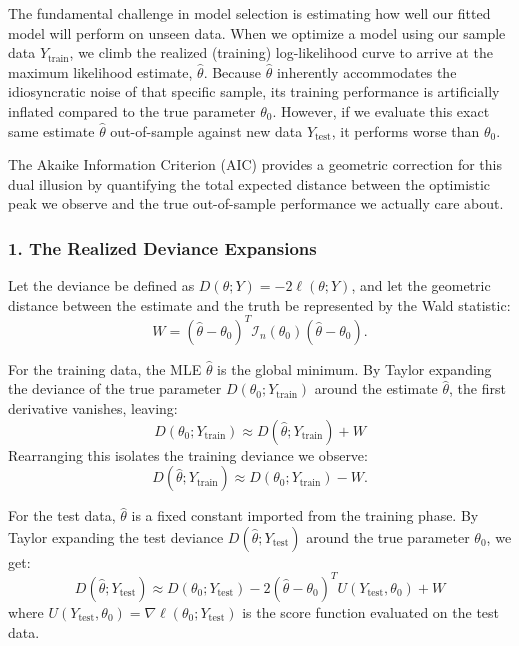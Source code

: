 \documentclass[
  letterpaper,
  DIV=11,
  numbers=noendperiod]{scrreprt}
\renewcommand{\[}{\begin{equation}}
\renewcommand{\]}{\end{equation}}
\theoremstyle{definition}
\theoremstyle{plain}
\theoremstyle{plain}
\theoremstyle{plain}
\theoremstyle{definition}
\theoremstyle{plain}
\theoremstyle{remark}
\begin{document}
The fundamental challenge in model selection is estimating how well our
fitted model will perform on unseen data. When we optimize a model using
our sample data \(Y_{\mathrm{train}}\), we climb the realized (training)
log-likelihood curve to arrive at the maximum likelihood estimate,
\(\hat{\theta}\). Because \(\hat{\theta}\) inherently accommodates the
idiosyncratic noise of that specific sample, its training performance is
artificially inflated compared to the true parameter \(\theta_0\).
However, if we evaluate this exact same estimate \(\hat{\theta}\)
out-of-sample against new data \(Y_{\mathrm{test}}\), it performs worse
than \(\theta_0\).

The Akaike Information Criterion (AIC) provides a geometric correction
for this dual illusion by quantifying the total expected distance
between the optimistic peak we observe and the true out-of-sample
performance we actually care about.

\subsubsection*{1. The Realized Deviance
Expansions}\label{the-realized-deviance-expansions}

Let the deviance be defined as \(D(\theta; Y) = -2\ell(\theta; Y)\), and
let the geometric distance between the estimate and the truth be
represented by the Wald statistic: \[
W = (\hat{\theta} - \theta_0)^T \mathcal{I}_n(\theta_0) (\hat{\theta} - \theta_0).
\]

For the training data, the MLE \(\hat{\theta}\) is the global minimum.
By Taylor expanding the deviance of the true parameter
\(D(\theta_0; Y_{\mathrm{train}})\) around the estimate
\(\hat{\theta}\), the first derivative vanishes, leaving: \[
D(\theta_0; Y_{\mathrm{train}}) \approx D(\hat{\theta}; Y_{\mathrm{train}}) + W
\] Rearranging this isolates the training deviance we observe: \[
\boxed{D(\hat{\theta}; Y_{\mathrm{train}}) \approx D(\theta_0; Y_{\mathrm{train}}) - W}.
\]

For the test data, \(\hat{\theta}\) is a fixed constant imported from
the training phase. By Taylor expanding the test deviance
\(D(\hat{\theta}; Y_{\mathrm{test}})\) around the true parameter
\(\theta_0\), we get: \[
D(\hat{\theta}; Y_{\mathrm{test}}) \approx D(\theta_0; Y_{\mathrm{test}}) - 2(\hat{\theta} - \theta_0)^T U(Y_{\mathrm{test}}, \theta_0) + W
\] where
\(U(Y_{\mathrm{test}}, \theta_0) = \nabla \ell(\theta_0; Y_{\mathrm{test}})\)
is the score function evaluated on the test data.
\end{document}
